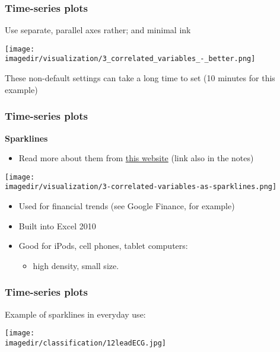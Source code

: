 \begin{frame}\frametitle{Time-series plots}
	Use separate, parallel axes rather; and minimal ink 
	\begin{center}
		\texttt{[image: \\imagedir/visualization/3\_correlated\_variables\_-\_better.png]}
	\end{center}
	These non-default settings can take a long time to set (10 minutes for this example)
\end{frame}

\begin{frame}\frametitle{Time-series plots}
	\textbf{Sparklines}
	\begin{itemize}
		\item	Read more about them from \href{http://www.edwardtufte.com/bboard/q-and-a-fetch-msg?msg_id=0001OR}{this website} (link also in the notes) 
	\end{itemize}
	\begin{center}
		\texttt{[image: \\imagedir/visualization/3-correlated-variables-as-sparklines.png]}
	\end{center}
	\begin{itemize}
		\item	Used for financial trends (see Google Finance, for example) 
		\item	Built into Excel 2010 
		\item	Good for iPods, cell phones, tablet computers: 
		\begin{itemize}
			\item	high density, small size. 
		\end{itemize}
	\end{itemize}
\end{frame}

\begin{frame}\frametitle{Time-series plots}
	Example of sparklines in everyday use:
	\begin{center}
		\texttt{[image: \\imagedir/classification/12leadECG.jpg]}
	\end{center}
\end{frame}


